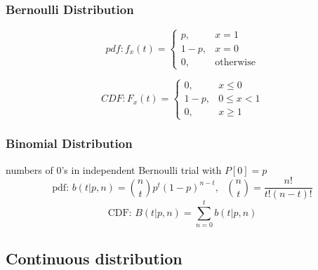 \documentclass{article}
\begin{document}
{{        \subsubsection{Bernoulli Distribution}{
            \[pdf: f_x(t)= \begin{cases} 
                p, & x = 1 \\ 
                1-p, & x = 0 \\
                0, & \text{otherwise}
            \end{cases}\]

            \[CDF: F_x(t)= \begin{cases} 
                0, & x \leqslant 0 \\ 
                1-p, & 0 \leqslant x < 1 \\
                0, & x \geqslant 1
            \end{cases}\]
        }
        \subsubsection{Binomial Distribution}{
            numbers of 0's in independent Bernoulli trial with $P[0]= p$
            \[\text{pdf: } b(t| p, n)= {n \choose t}p^t (1-p)^{n-t}, \text{ } {n \choose t}=\frac{n!}{t!(n-t)!}\]
            \[\text{CDF: } B(t| p, n)= \sum_{n=0}^t b(t| p, n)\]
        }
    }
    \subsection{Continuous distribution}{
}}
\end{document}
